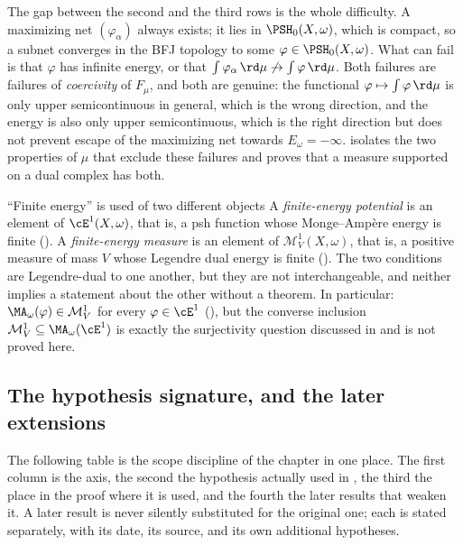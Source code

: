 The gap between the second and the third rows is the whole difficulty.  A
maximizing net $(\varphi_\alpha)$ always exists; it lies in
$\PSH_0(X,\omega)$, which is compact, so a subnet converges in the BFJ
topology to some $\varphi\in\PSH_0(X,\omega)$.  What can fail is that
$\varphi$ has infinite energy, or that
$\int\varphi_\alpha\,\rd\mu\not\to\int\varphi\,\rd\mu$.  Both failures are
failures of \emph{coercivity} of $F_\mu$, and both are genuine: the
functional $\varphi\mapsto\int\varphi\,\rd\mu$ is only upper
semicontinuous in general, which is the wrong direction, and the energy is
also only upper semicontinuous, which is the right direction but does not
prevent escape of the maximizing net towards $E_\omega=-\infty$.
 isolates the two properties of $\mu$ that
exclude these failures and proves that a measure supported on a dual complex
has both.

\begin{warning}{``Finite energy'' is used of two different objects}
A \emph{finite-energy potential} is an element of $\cE^1(X,\omega)$, that
is, a psh function whose Monge--Amp\`ere energy is finite
().  A \emph{finite-energy measure} is an element of
$\mathcal M^1_V(X,\omega)$, that is, a positive measure of mass $V$
whose Legendre dual energy is finite
().  The two conditions are Legendre-dual to
one another, but they are not interchangeable, and neither implies a
statement about the other without a theorem.  In particular:
$\MA_\omega(\varphi)\in\mathcal M^1_V$ for every $\varphi\in\cE^1$
(), but the converse inclusion
$\mathcal M^1_V\subseteq\MA_\omega(\cE^1)$ is exactly the surjectivity
question discussed in  and is not proved here.
\end{warning}

\subsection{The hypothesis signature, and the later extensions}
\label{sec:ch28-scope}

The following table is the scope discipline of the chapter in one place.
The first column is the axis, the second the hypothesis actually used in
, the third the place in the proof where it is
used, and the fourth the later results that weaken it.  A later result is
never silently substituted for the original one; each is stated separately,
with its date, its source, and its own additional hypotheses.

